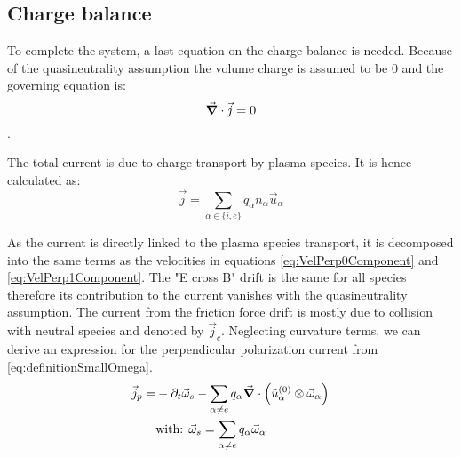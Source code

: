 \subsection{Charge balance}
To complete the system, a last equation on the charge balance is needed. Because of the quasineutrality assumption the volume charge is assumed to be 0 and the governing equation is: $$\vec{\grad}\cdot\vec{j} = 0$$.

The total current is due to charge transport by plasma species. It is hence calculated as: 
\begin{equation}
	\vec{j} = \sum_{\alpha \in \{i,e\}} q_\alpha n_\alpha \vec{u}_\alpha
\end{equation}

As the current is directly linked to the plasma species transport, it is decomposed into the same terms as the velocities in equations \ref{eq:VelPerp0Component} and \ref{eq:VelPerp1Component}. The "E cross B" drift is the same for all species therefore its contribution to the current vanishes with the quasineutrality assumption. The current from the friction force drift is mostly due to collision with neutral species and denoted by $\vec{j}_{c}$. Neglecting curvature terms, we can derive an expression for the perpendicular polarization current from \autoref{eq:definitionSmallOmega}.
\begin{align}
	\vec{j}_{p} =& -\partial_t\vec{\omega}_s - \sum_{\alpha\neq e}q_\alpha\vec{\grad}\cdot\left(\tilde{u}^{(0)}_\alpha\otimes\vec{\omega}_\alpha\right) \\
	&\text{with:  }\vec{\omega}_s = \sum_{\alpha\neq e}q_\alpha\vec{\omega}_\alpha \nonumber
\end{align}

